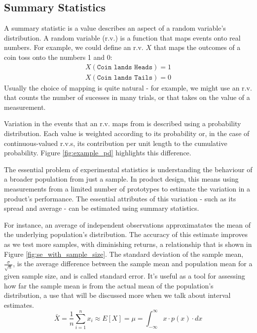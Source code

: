 \documentclass[11pt,a4paper,article]{memoir} %
\begin{document}
\subsection*{Summary Statistics}
 A summary statistic is a value describes an aspect of a random variable's distribution. A random variable (r.v.) is a function that maps events onto real numbers. For example, we could define an r.v. $X$ that maps the outcomes of a coin toss onto the numbers 1 and 0:
 \begin{align}
	X(\texttt{Coin lands Heads}) = 1 \\
	X(\texttt{Coin lands Tails}) =0
 \end{align}
Usually the choice of mapping is quite natural - for example, we might use an r.v. that counts the number of sucesses in many trials, or that takes on the value of a measurement.
\par
Variation in the events that an r.v. maps from is described using a probability distribution. Each value is weighted according to its probability or, in the case of continuous-valued r.v.s, its contribution per unit length to the cumulative probability. Figure \ref{fig:example_pd} highlights this difference.
\par
The essential problem of experimental statistics is understanding the behaviour of a broader population from just a sample. In product design, this means using measurements from a limited number of prototypes to estimate the variation in a product's performance. The essential attributes of this variation - such as its spread and average - can be estimated using summary statistics.
 \par
For instance, an average of independent observations approximatates the mean of the underlying population's distribution. The accuracy of this estimate improves as we test more samples, with diminishing returns, a relationship that is shown in Figure \ref{fig:se_with_sample_size}. The standard deviation of the sample mean, $\frac{\sigma}{\sqrt{n}}$, is the average difference between the sample mean and population mean for a given sample size, and is called standard error. It's useful as a tool for assessing how far the sample mean is from the actual mean of the population's distribution, a use that will be discussed more when we talk about interval estimates.
\begin{equation}
	\bar{X} = \frac{1}{n}\sum_{i = 1}^{n}x_i  \approx E[X]= \mu = \int_{-\infty}^{\infty}x\cdot p(x)\cdot dx
\end{equation}
\end{document}
